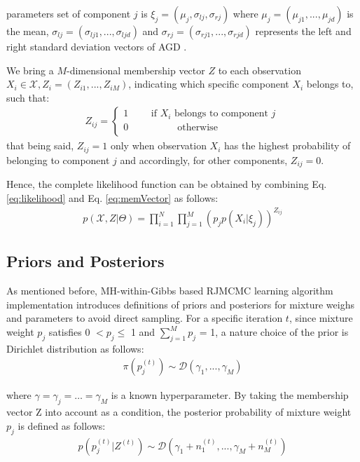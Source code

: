 \documentclass[conference]{IEEEtran}
\begin{document}
parameters set of component $j$ is $\xi_j = (\mu_j,\sigma_{lj},\sigma_{rj})$ where $\mu_j = (\mu_{j1},...,\mu_{jd})$ is the mean, $\sigma_{lj} = (\sigma_{lj1},...,\sigma_{ljd})$ and $\sigma_{rj} = (\sigma_{rj1},...,\sigma_{rjd})$ represents the left and right standard deviation vectors of AGD . 

We bring a $M$-dimensional membership vector $Z$ to each observation $X_i\in\mathcal{X}, Z_i = (Z_{i1},...,Z_{iM})$, indicating which specific component $X_i$ belongs to\cite{Bouguila2006}, such that:
\begin{align}
Z_{ij} = \left\{\begin{matrix}
1\qquad\mbox{ if }X_i\mbox{  belongs to component }j \\
0\qquad\quad\qquad \mbox{otherwise} \qquad\qquad\quad\quad \\
\end{matrix}\right.
\label{eq:memVector}
\end{align}
that being said, $Z_{ij} = 1$ only when observation $X_i$ has the highest probability of belonging to component $j$ and accordingly, for other components, $Z_{ij} = 0$. 

Hence, the complete likelihood function can be obtained by combining Eq. \eqref{eq:likelihood} and Eq. \eqref{eq:memVector} as follows:
\begin{align}
p(\mathcal{X}, Z|\Theta) = \prod_{i=1}^{N}\prod_{j=1}^{M}(p_jp(X_i|\xi_j))^{Z_{ij}}
\label{eq:compPdf}
\end{align}


\subsection{Priors and Posteriors}
As mentioned before, MH-within-Gibbs based RJMCMC learning algorithm implementation introduces definitions of priors and posteriors for mixture weighs and parameters to avoid direct sampling. For a specific iteration $t$, since mixture weight $p_j$ satisfies 0 $< p_j \leq$ 1 and $\sum_{j=1}^Mp_j$ = 1, a nature choice of the prior is Dirichlet distribution\cite{Elguebaly2013} as follows:
\begin{align}
\pi(p_j^{(t)}) \sim \mathcal{D}(\gamma_1,...,\gamma_M )
\label{eq:priorWeight}
\end{align}

where $\gamma = \gamma_j = \dots = \gamma_M$ is a known hyperparameter. By taking the membership vector Z into account as a condition, the posterior probability of mixture weight $p_j$ is defined as follows:
\begin{align}
p(p_j^{(t)}|Z^{(t)}) \sim \mathcal{D}(\gamma_1 + n_1^{(t)},...,\gamma_M + n_M^{(t)})
\label{eq:posterWeight}
\end{align}
\end{document}
